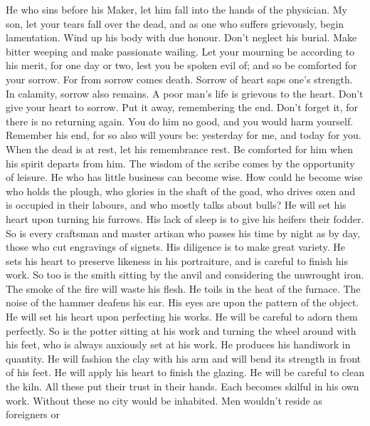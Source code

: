  He who sins before his Maker, let him fall into the hands
of the physician.  My son, let your tears fall over the
dead, and as one who suffers grievously, begin lamentation. Wind up his
body with due honour. Don't neglect his burial.  Make
bitter weeping and make passionate wailing. Let your mourning be
according to his merit, for one day or two, lest you be spoken evil of;
and so be comforted for your sorrow.  For from sorrow comes
death. Sorrow of heart saps one's strength.  In calamity,
sorrow also remains. A poor man's life is grievous to the heart.
 Don't give your heart to sorrow. Put it away, remembering
the end.  Don't forget it, for there is no returning again.
You do him no good, and you would harm yourself.  Remember
his end, for so also will yours be: yesterday for me, and today for you.
 When the dead is at rest, let his remembrance rest. Be
comforted for him when his spirit departs from him.  The
wisdom of the scribe comes by the opportunity of leisure. He who has
little business can become wise.  How could he become wise
who holds the plough, who glories in the shaft of the goad, who drives
oxen and is occupied in their labours, and who mostly talks about bulls?
 He will set his heart upon turning his furrows. His lack
of sleep is to give his heifers their fodder.  So is every
craftsman and master artisan who passes his time by night as by day,
those who cut engravings of signets. His diligence is to make great
variety. He sets his heart to preserve likeness in his portraiture, and
is careful to finish his work.  So too is the smith sitting
by the anvil and considering the unwrought iron. The smoke of the fire
will waste his flesh. He toils in the heat of the furnace. The noise of
the hammer deafens his ear. His eyes are upon the pattern of the object.
He will set his heart upon perfecting his works. He will be careful to
adorn them perfectly.  So is the potter sitting at his work
and turning the wheel around with his feet, who is always anxiously set
at his work. He produces his handiwork in quantity.  He
will fashion the clay with his arm and will bend its strength in front
of his feet. He will apply his heart to finish the glazing. He will be
careful to clean the kiln.  All these put their trust in
their hands. Each becomes skilful in his own work.  Without
these no city would be inhabited. Men wouldn't reside as foreigners or
